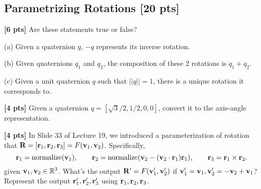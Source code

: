 \begin{questions}
    \section{Parametrizing Rotations [20 pts]}

    \question \textbf{[6 pts]} Are these statements true or false?

    (a) Given a quaternion $q$, $-q$ represents its inverse rotation.

    \begin{tcolorbox}[fit,height=6cm, width=\textwidth, blank, borderline={0.5pt}{-2pt},halign=left, valign=center, nobeforeafter]


    \end{tcolorbox}

    (b) Given quaternions $q_1$ and $q_2$, the composition of these 2 rotations is $q_1 + q_2$.

    \begin{tcolorbox}[fit,height=6cm, width=\textwidth, blank, borderline={0.5pt}{-2pt},halign=left, valign=center, nobeforeafter]


    \end{tcolorbox}

    (c) Given a unit quaternion $q$ such that $||q||=1$, there is a unique rotation it corresponds to.

    \begin{tcolorbox}[fit,height fill, width=\textwidth, blank, borderline={0.5pt}{-2pt},halign=left, valign=center, nobeforeafter]


    \end{tcolorbox}

    \clearpage

    \question \textbf{[4 pts]} Given a quaternion $q = [\sqrt{3}/2, 1/2, 0, 0]$, convert it to the axis-angle representation.

    \begin{tcolorbox}[fit,height fill, width=\textwidth, blank, borderline={0.5pt}{-2pt},halign=left, valign=center, nobeforeafter]


    \end{tcolorbox}

    \question \textbf{[4 pts]} In Slide 33 of Lecture 19, we introduced a parameterization of rotation that $\mathbf{R} = [\mathbf{r}_1, \mathbf{r}_2, \mathbf{r}_3] = F(\mathbf{v}_1, \mathbf{v}_2)$. Specifically,
    \begin{equation*}
        \mathbf{r}_1 = \text{normalize}(\mathbf{v}_1), \qquad \mathbf{r}_2 = \text{normalize}(\mathbf{v}_2 - (\mathbf{v}_2 \cdot \mathbf{r}_1)\mathbf{r}_1), \qquad \mathbf{r}_3 = \mathbf{r}_1 \times \mathbf{r}_2.
    \end{equation*}
    given $\mathbf{v}_1, \mathbf{v}_2 \in \mathbb{R}^3$. What's the output $\mathbf{R}'= F(\mathbf{v}_1',\mathbf{v}_2')$ if $\mathbf{v}_1'=\mathbf{v}_1, \mathbf{v}_2' = -\mathbf{v}_2+\mathbf{v}_1$? Represent the output $\mathbf{r}_1', \mathbf{r}_2', \mathbf{r}_3'$ using $\mathbf{r}_1, \mathbf{r}_2, \mathbf{r}_3$.


\end{questions}
